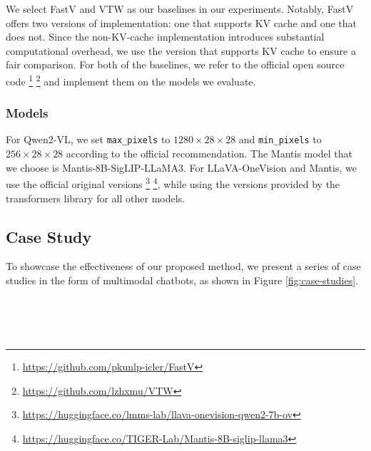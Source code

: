 We select FastV and VTW as our baselines in our experiments. Notably, FastV offers two versions of implementation: one that supports KV cache and one that does not. Since the non-KV-cache implementation introduces substantial computational overhead, we use the version that supports KV cache to ensure a fair comparison. For both of the baselines, we refer to the official open source code \footnote{\url{https://github.com/pkunlp-icler/FastV}} \footnote{\url{https://github.com/lzhxmu/VTW}} and implement them on the models we evaluate.

\subsubsection{Models}\label{asec:eval-setting-impl}

For Qwen2-VL, we set \texttt{max\_pixels} to $1280 \times 28 \times 28$ and \texttt{min\_pixels} to $256 \times 28 \times 28$ according to the official recommendation. The Mantis model that we choose is Mantis-8B-SigLIP-LLaMA3. For LLaVA-OneVision and Mantis, we use the official original versions \footnote{\url{https://huggingface.co/lmms-lab/llava-onevision-qwen2-7b-ov}} \footnote{\url{https://huggingface.co/TIGER-Lab/Mantis-8B-siglip-llama3}}, while using the versions provided by the transformers library \cite{wolf-etal-2020-transformers} for all other models.

\subsection{Case Study}

To showcase the effectiveness of our proposed method, we present a series of case studies in the form of multimodal chatbots, as shown in Figure \ref{fig:case-studies}.

\begin{figure*}[ht]
	\centering
        \\ \quad \\ \quad \\
	\caption{\textbf{Multimodal Chatbots with different pruning methods.}}
		\label{fig:case-studies}
\end{figure*}